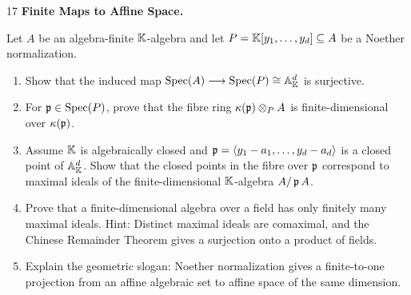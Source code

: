 \documentclass[Notebook.tex]{subfiles}
\begin{document}
\begin{problem}{17}  \textbf{Finite Maps to Affine Space.} 

    Let $A$ be an algebra-finite $\mathbb K$-algebra and let $P=\mathbb K[y_1,\ldots,y_d]\subseteq A$ be a Noether normalization.
    \begin{enumerate}
        \item Show that the induced map $\operatorname{Spec}(A)\longrightarrow \operatorname{Spec}(P)\cong \mathbb{A}^d_{\mathbb K}$ is surjective.
        \item For $\operatorname{\mathfrak{p}}\in\operatorname{Spec}(P)$, prove that the fibre ring $\kappa(\operatorname{\mathfrak{p}})\otimes_P A$ is finite-dimensional over $\kappa(\operatorname{\mathfrak{p}})$.
        \item Assume $\mathbb K$ is algebraically closed and $\operatorname{\mathfrak{p}}=\langle y_1-a_1,\ldots,y_d-a_d\rangle$ is a closed point of $\mathbb A^d_{\mathbb K}$. Show that the closed points in the fibre over $\operatorname{\mathfrak{p}}$ correspond to maximal ideals of the finite-dimensional $\mathbb K$-algebra $A/\operatorname{\mathfrak{p}} A$.
        \item Prove that a finite-dimensional algebra over a field has only finitely many maximal ideals. Hint: Distinct maximal ideals are comaximal, and the Chinese Remainder Theorem gives a surjection onto a product of fields.
        \item Explain the geometric slogan: Noether normalization gives a finite-to-one projection from an affine algebraic set to affine space of the same dimension.
    \end{enumerate}    
\end{problem}
\end{document}
